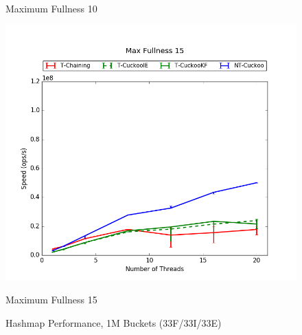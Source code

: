 \begin{figure}[H]
\begin{minipage}{0.45\textwidth}
        \caption*{Maximum Fullness 10}
    \end{minipage}
	\begin{minipage}{0.45\textwidth}\includegraphics[width=\textwidth]{maps/15HM1M:F34,I33,E33.png} 
        \caption*{Maximum Fullness 15}
    \end{minipage}
	\caption{Hashmap Performance, 1M Buckets (33F/33I/33E)}
\end{figure}
